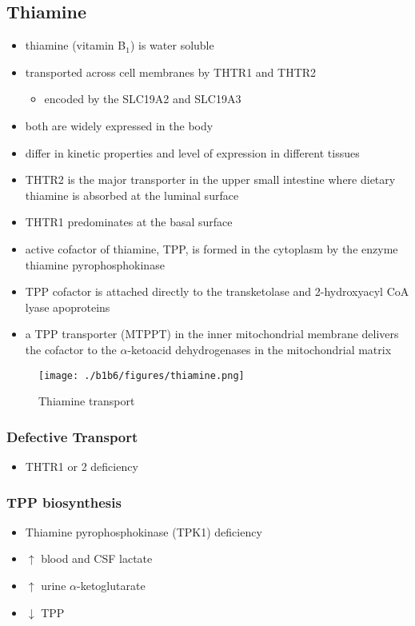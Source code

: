 \documentclass{scrartcl}
\begin{document}
\subsection{Thiamine}
\label{sec:org032233a}
\begin{itemize}
\item thiamine (vitamin B\(_{\text{1}}\)) is water soluble
\item transported across cell membranes by THTR1 and THTR2
\begin{itemize}
\item encoded by the SLC19A2 and SLC19A3
\end{itemize}
\item both are widely expressed in the body
\item differ in kinetic properties and level of expression in different tissues
\item THTR2 is the major transporter in the upper small intestine where
dietary thiamine is absorbed at the luminal surface
\item THTR1 predominates at the basal surface
\item active cofactor of thiamine, TPP, is formed in the cytoplasm by the
enzyme thiamine pyrophosphokinase
\item TPP cofactor is attached directly to the transketolase and 2-hydroxyacyl CoA lyase apoproteins
\item a TPP transporter (MTPPT) in the inner mitochondrial membrane
delivers the cofactor to the \(\alpha\)-ketoacid dehydrogenases in the
mitochondrial matrix
\end{itemize}

\begin{figure}[htbp]
\centering
\texttt{[image: ./b1b6/figures/thiamine.png]}
\caption{\label{fig:org460822d}
Thiamine transport}
\end{figure}

\subsubsection{Defective Transport}
\label{sec:org9911c86}
\begin{itemize}
\item THTR1 or 2 deficiency
\end{itemize}
\subsubsection{TPP biosynthesis}
\label{sec:org1da2d4d}
\begin{itemize}
\item Thiamine pyrophosphokinase (TPK1) deficiency
\item \(\uparrow\) blood and CSF lactate
\item \(\uparrow\) urine \(\alpha\)-ketoglutarate
\item \(\downarrow\) TPP
\end{itemize}
\end{document}
